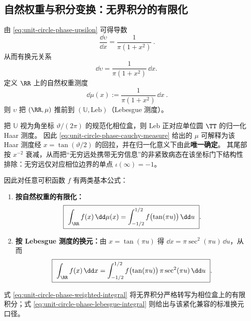 \subsection{自然权重与积分变换：无界积分的有限化}\label{subsec:unit-circle-phase-integrals}
由 \eqref{eq:unit-circle-phase-upsilon} 可得导数
\begin{equation}\label{eq:unit-circle-phase-derivative}
\boxed{\ \frac{\dd \upsilon}{\dd x}=\frac{1}{\pi(1+x^2)}\ }.
\end{equation}
从而有换元关系
\[
\dd \upsilon=\frac{1}{\pi(1+x^2)}\,\dd x.
\]
定义 \(\RR\) 上的自然权重测度
\begin{equation}\label{eq:unit-circle-phase-cauchy-measure}
\boxed{\ \dd\mu(x):=\frac{1}{\pi(1+x^2)}\,\dd x\ }.
\end{equation}
则 \(\upsilon\) 把 \((\RR,\mu)\) 推前到 \((\mathbb{U},\mathrm{Leb})\)（Lebesgue 测度）。
\begin{remark}\label{rem:unit-circle-phase-haar-pullback-weight}
把 \(\mathbb{U}\) 视为角坐标 \(\vartheta/(2\pi)\) 的规范化相位盒，则 \(\mathrm{Leb}\) 正对应单位圆 \(\TT\) 的归一化 Haar 测度。
因此 \eqref{eq:unit-circle-phase-cauchy-measure} 给出的 \(\mu\) 可解释为该 Haar 测度经 \(x=\tan(\vartheta/2)\) 的回拉，并在归一化意义下由此\textbf{唯一确定}。
其尾部按 \(x^{-2}\) 衰减，从而把“无穷远处携带无穷信息”的非紧致病态在该坐标门下结构性排除：无穷远仅对应相位边界的单点 \(\iota(\infty)=-1\)。
\end{remark}
因此对任意可积函数 \(f\) 有两类基本公式：
\begin{enumerate}
  \item \textbf{按自然权重的有限化：}
  \begin{equation}\label{eq:unit-circle-phase-weighted-integral}
  \boxed{\ \int_{\RR} f(x)\,\dd\mu(x)=\int_{-1/2}^{1/2} f\bigl(\tan(\pi u)\bigr)\,\dd u\ }.
  \end{equation}
  \item \textbf{按 Lebesgue 测度的换元：}由 \(x=\tan(\pi u)\) 得 \(\dd x=\pi\sec^2(\pi u)\,\dd u\)，从而
  \begin{equation}\label{eq:unit-circle-phase-lebesgue-integral}
  \boxed{\ \int_{\RR} f(x)\,\dd x=\int_{-1/2}^{1/2} f\bigl(\tan(\pi u)\bigr)\,\pi\sec^2(\pi u)\,\dd u\ }.
  \end{equation}
\end{enumerate}
式 \eqref{eq:unit-circle-phase-weighted-integral} 将无界积分严格转写为相位盒上的有限积分；式 \eqref{eq:unit-circle-phase-lebesgue-integral} 则给出与该紧化兼容的标准换元口径。
